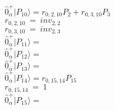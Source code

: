 \documentclass[14pt]{article}
\begin{document}
    $ \hat{0}_{\alpha}^{+} \vert{P_{10}}\rangle = {r}_{0,2,10}P_{2}+{r}_{0,3,10}P_{3} $ \\ 
    ${r}_{0,2,10}\ =\ {inv}_{2,2} $ \\ 
    ${r}_{0,3,10}\ =\ {inv}_{2,3} $ \\ 
    $ \hat{0}_{\alpha}^{+} \vert{P_{11}}\rangle =  $ \\ 
    $ \hat{0}_{\alpha}^{+} \vert{P_{12}}\rangle =  $ \\ 
    $ \hat{0}_{\alpha}^{+} \vert{P_{13}}\rangle =  $ \\ 
    $ \hat{0}_{\alpha}^{+} \vert{P_{14}}\rangle = {r}_{0,15,14}P_{15} $ \\ 
    ${r}_{0,15,14}\ =\ 1 $ \\ 
    $ \hat{0}_{\alpha}^{+} \vert{P_{15}}\rangle =  $ \\ 
    
\end{document}
